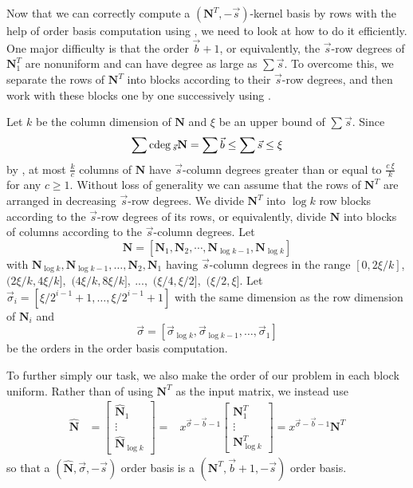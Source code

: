 Now that we can correctly compute a $\left(\mathbf{N}^{T},-\vec{s}\right)$-kernel
basis by rows with the help of order basis computation using ,
we need to look at how to do it efficiently. One major difficulty
is that the order $\vec{b}+1$, or equivalently, the $\vec{s}$-row
degrees of $\mathbf{N}_{1}^{T}$ are nonuniform and can have degree
as large as $\sum\vec{s}$. To overcome this, we separate the rows
of $\mathbf{N}^{T}$ into blocks according to their $\vec{s}$-row
degrees, and then work with these blocks one by one successively using
. 



Let $k$ be the column dimension of $\mathbf{N}$ and $\xi$ be an
upper bound of $\sum\vec{s}$. Since 
\[
\sum{\rm cdeg}\,_{\vec{s}}\mathbf{N}=\sum\vec{b}\le\sum\vec{s}\le\xi
\]
 by , at most
$\frac{k}{c}$ columns of $\mathbf{N}$ have $\vec{s}$-column degrees
greater than or equal to $\frac{c~\xi}{k}$ for any $c\ge1$. Without
loss of generality we can assume that the rows of $\mathbf{N}^{T}$
are arranged in decreasing $\vec{s}$-row degrees. We divide $\mathbf{N}^{T}$
into $\log k$ row blocks according to the $\vec{s}$-row degrees
of its rows, or equivalently, divide $\mathbf{N}$ into blocks of
columns according to the $\vec{s}$-column degrees. Let 
\[
\mathbf{N}=\left[\mathbf{N}_{1},\mathbf{N}_{2},\cdots,\mathbf{N}_{\log k-1},\mathbf{N}_{\log k}\right]
\]
with $\mathbf{N}_{\log k},\mathbf{N}_{\log k-1},\dots,\mathbf{N}_{2},\mathbf{N}_{1}$
having $\vec{s}$-column degrees in the range $\left[0,2\xi/k\right]$,
$(2\xi/k,4\xi/k],$ $(4\xi/k,8\xi/k],\ ...,$ $(\xi/4,\xi/2],$ $(\xi/2,\xi].$
Let $\vec{\sigma}_{i}=\left[\xi/2^{i-1}+1,\dots,\xi/2^{i-1}+1\right]$
with the same dimension as the row dimension of $\mathbf{N}_{i}$
and 
\[
\vec{\sigma}=\left[\vec{\sigma}_{\log k},\vec{\sigma}_{\log k-1},\dots,\vec{\sigma}_{1}\right]
\]
 be the orders in the order basis computation.

To further simply our task, we also make the order of our problem
in each block uniform. Rather than of using $\mathbf{N}^{T}$ as the
input matrix, we instead use 
\begin{eqnarray*}
\hat{\mathbf{N}} & =\begin{bmatrix}\hat{\mathbf{N}}_{1}\\
\vdots\\
\hat{\mathbf{N}}_{\log k}
\end{bmatrix}= & x^{\vec{\sigma}-\vec{b}-1}\begin{bmatrix}\mathbf{N}_{1}^{T}\\
\vdots\\
\mathbf{N}_{\log k}^{T}
\end{bmatrix}=x^{\vec{\sigma}-\vec{b}-1}\mathbf{N}^{T}
\end{eqnarray*}
so that a $\left(\hat{\mathbf{N}},\vec{\sigma},-\vec{s}\right)$ order
basis is a $\left(\mathbf{N}^{T},\vec{b}+1,-\vec{s}\right)$ order
basis.

